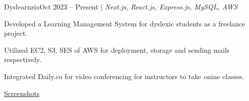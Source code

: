 \resumeSubheadings
{Dyslearnzia}{Oct 2023 -- Present}
{}{}{| \textit{Next.js, React.js, Express.js, MySQL, AWS}}
\resumeItemListStart
\item Developed a Learning Management System for dyslexic students as a freelance project.
\item Utilized EC2, S3, SES of AWS for deployment, storage and sending mails respectively.
\item Integrated Daily.co for video conferencing for instructors to take onine classes.
\item \href{https://www.figma.com/proto/PuKx8clKWktgN4zF7E2Y7f/Untitled?type=design&node-id=1-2&t=TLtNjbLPKdiKb03F-8&scaling=min-zoom&page-id=0%3A1&disable-default-keyboard-nav=1&hotspot-hints=0&hide-ui=1}{\underline{Screenshots}}
\resumeItemListEnd